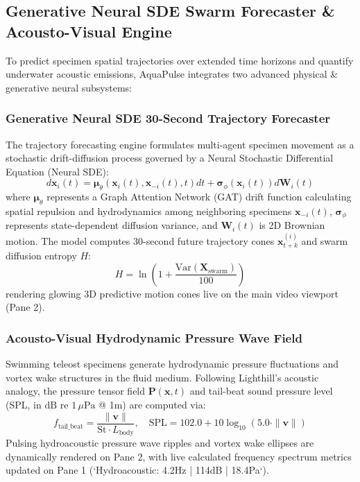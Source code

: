 \documentclass[11pt,a4paper]{article}
\begin{document}
\subsection{Generative Neural SDE Swarm Forecaster \& Acousto-Visual Engine}
To predict specimen spatial trajectories over extended time horizons and quantify underwater acoustic emissions, AquaPulse integrates two advanced physical \& generative neural subsystems:

\subsubsection{Generative Neural SDE 30-Second Trajectory Forecaster}
The trajectory forecasting engine formulates multi-agent specimen movement as a stochastic drift-diffusion process governed by a Neural Stochastic Differential Equation (Neural SDE):
\begin{equation}
d\mathbf{x}_i(t) = \boldsymbol{\mu}_{\theta}\left(\mathbf{x}_i(t), \mathbf{x}_{-i}(t), t\right) dt + \boldsymbol{\sigma}_{\phi}\left(\mathbf{x}_i(t)\right) d\mathbf{W}_i(t)
\end{equation}
where $\boldsymbol{\mu}_{\theta}$ represents a Graph Attention Network (GAT) drift function calculating spatial repulsion and hydrodynamics among neighboring specimens $\mathbf{x}_{-i}(t)$, $\boldsymbol{\sigma}_{\phi}$ represents state-dependent diffusion variance, and $\mathbf{W}_i(t)$ is 2D Brownian motion. The model computes 30-second future trajectory cones $\mathbf{x}_{t+k}^{(i)}$ and swarm diffusion entropy $H$:
\begin{equation}
H = \ln\left(1 + \frac{\text{Var}(\mathbf{X}_{\text{swarm}})}{100}\right)
\end{equation}
rendering glowing 3D predictive motion cones live on the main video viewport (Pane 2).

\subsubsection{Acousto-Visual Hydrodynamic Pressure Wave Field}
Swimming teleost specimens generate hydrodynamic pressure fluctuations and vortex wake structures in the fluid medium. Following Lighthill's acoustic analogy, the pressure tensor field $\mathbf{P}(\mathbf{x}, t)$ and tail-beat sound pressure level (SPL, in $\text{dB re } 1\,\mu\text{Pa}$ @ 1m) are computed via:
\begin{equation}
f_{\text{tail\_beat}} = \frac{\|\mathbf{v}\|}{\text{St} \cdot L_{\text{body}}}, \quad \text{SPL} = 102.0 + 10 \log_{10}\left(5.0 \cdot \|\mathbf{v}\|\right)
\end{equation}
Pulsing hydroacoustic pressure wave ripples and vortex wake ellipses are dynamically rendered on Pane 2, with live calculated frequency spectrum metrics updated on Pane 1 (`Hydroacoustic: 4.2Hz | 114dB | 18.4Pa`).
\end{document}

